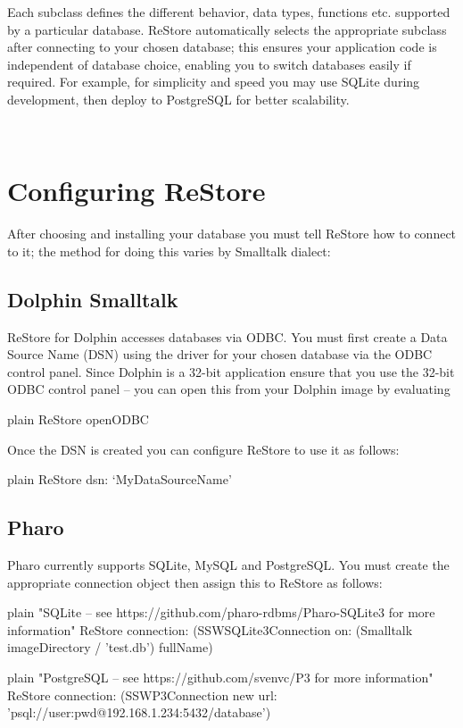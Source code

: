 \documentclass[10pt,twoside,english]{_support/latex/sbabook/sbabook}
\begin{document}
Each subclass defines the different behavior, data types, functions etc. supported by a particular database. ReStore automatically selects the appropriate subclass after connecting to your chosen database; this ensures your application code is independent of database choice, enabling you to switch databases easily if required. For example, for simplicity and speed you may use SQLite during development, then deploy to PostgreSQL for better scalability.

 
\section{Configuring ReStore}
After choosing and installing your database you must tell ReStore how to connect to it; the method for doing this varies by Smalltalk dialect:
\subsection{Dolphin Smalltalk}
ReStore for Dolphin accesses databases via ODBC. You must first create a Data Source Name (DSN) using the driver for your chosen database via the ODBC control panel. Since Dolphin is a 32-bit application ensure that you use the 32-bit ODBC control panel – you can open this from your Dolphin image by evaluating 

\begin{displaycode}{plain}
ReStore openODBC
\end{displaycode}

Once the DSN is created you can configure ReStore to use it as follows:

\begin{displaycode}{plain}
ReStore dsn: ‘MyDataSourceName’
\end{displaycode}
\subsection{Pharo}
Pharo currently supports SQLite, MySQL and PostgreSQL. You must create the appropriate connection object then assign this to ReStore as follows:

\begin{displaycode}{plain}
"SQLite – see https://github.com/pharo-rdbms/Pharo-SQLite3 for more information"
ReStore connection: (SSWSQLite3Connection on: (Smalltalk imageDirectory / 'test.db') fullName)
\end{displaycode}

\begin{displaycode}{plain}
"PostgreSQL – see https://github.com/svenvc/P3 for more information"
ReStore connection: (SSWP3Connection new url: 'psql://user:pwd@192.168.1.234:5432/database')
\end{displaycode}
\end{document}
